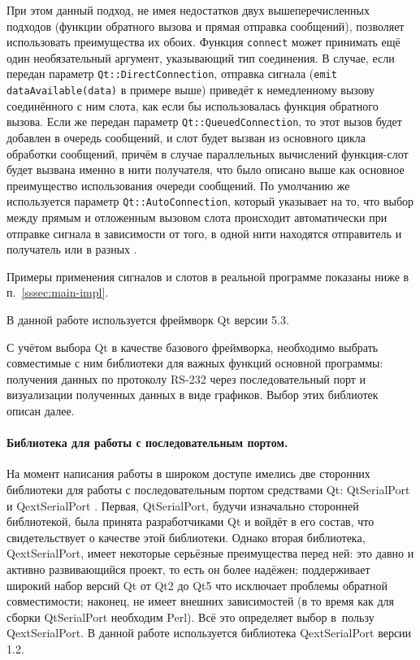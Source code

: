 \documentclass[a4paper, 14pt, titlepage]{extarticle}
\newcommand{\inlinecode}[1]{\lstinline[basicstyle=\ttfamily]{#1}}
\begin{document}
  При этом данный подход, не имея недостатков двух вышеперечисленных подходов (функции обратного
  вызова и прямая отправка сообщений), позволяет использовать преимущества их обоих. Функция
  \inlinecode{connect} может принимать ещё один необязательный аргумент, указывающий тип соединения.
  В случае, если передан параметр \inlinecode{Qt::DirectConnection}, отправка сигнала
  (\inlinecode{emit dataAvailable(data)} в примере выше) приведёт к немедленному вызову соединённого
  с ним слота, как если бы использовалась функция обратного вызова.  Если же передан параметр
  \inlinecode{Qt::QueuedConnection}, то этот вызов будет добавлен в очередь сообщений, и слот будет
  вызван из основного цикла обработки сообщений, причём в случае параллельных вычислений
  функция-слот будет вызвана именно в нити получателя, что было описано выше как основное
  преимущество использования очереди сообщений. По умолчанию же используется параметр
  \inlinecode{Qt::AutoConnection}, который указывает на то, что выбор между прямым и отложенным
  вызовом слота происходит автоматически при отправке сигнала в зависимости от того, в одной
  нити находятся отправитель и получатель или в разных \cite{qt-connection-type}.

  Примеры применения сигналов и слотов в реальной программе показаны ниже в п.~\ref{sssec:main-impl}.

  В данной работе используется фреймворк Qt версии 5.3.

  С учётом выбора Qt в качестве базового фреймворка, необходимо выбрать совместимые с ним библиотеки
  для важных функций основной программы: получения данных по протоколу RS-232 через последовательный
  порт и визуализации полученных данных в виде графиков. Выбор этих библиотек описан далее.

  \paragraph{Библиотека для работы с последовательным портом.}
  На момент написания работы в широком доступе имелись две сторонних библиотеки для работы с
  последовательным портом средствами Qt: QtSerialPort \cite{qtserialport} и QextSerialPort \cite{qextserialport}.
  Первая, QtSerialPort, будучи изначально сторонней библиотекой, была принята разработчиками Qt и
  войдёт в его состав, что свидетельствует о качестве этой библиотеки. Однако вторая
  библиотека, QextSerialPort, имеет некоторые серьёзные преимущества перед ней: это давно и активно
  развивающийся проект, то есть он более надёжен; поддерживает широкий набор версий Qt от Qt2 до Qt5
  что исключает проблемы обратной совместимости; наконец, не имеет внешних зависимостей (в то время
  как для сборки QtSerialPort необходим Perl). Всё это определяет выбор в~пользу QextSerialPort.
  В данной работе используется библиотека QextSerialPort версии 1.2.
\end{document}
